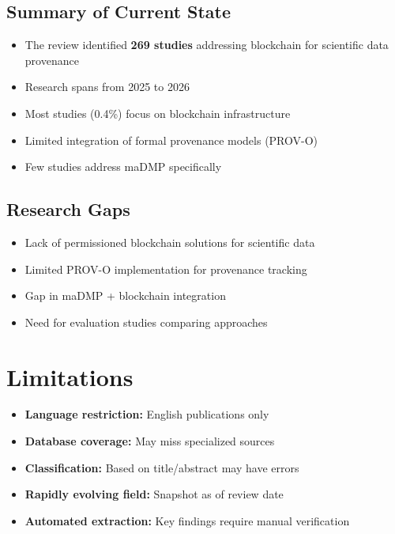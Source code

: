 \documentclass{article}
\begin{document}
\subsection{Summary of Current State}

\begin{itemize}
    \item The review identified \textbf{269 studies} addressing blockchain for scientific data provenance
    \item Research spans from 2025 to 2026
    \item Most studies (0.4\%) focus on blockchain infrastructure
    \item Limited integration of formal provenance models (PROV-O)
    \item Few studies address maDMP specifically
\end{itemize}

\subsection{Research Gaps}

\begin{itemize}
    \item Lack of permissioned blockchain solutions for scientific data
    \item Limited PROV-O implementation for provenance tracking
    \item Gap in maDMP + blockchain integration
    \item Need for evaluation studies comparing approaches
\end{itemize}

\section{Limitations}

\begin{itemize}
    \item \textbf{Language restriction:} English publications only
    \item \textbf{Database coverage:} May miss specialized sources
    \item \textbf{Classification:} Based on title/abstract may have errors
    \item \textbf{Rapidly evolving field:} Snapshot as of review date
    \item \textbf{Automated extraction:} Key findings require manual verification
\end{itemize}
\end{document}
